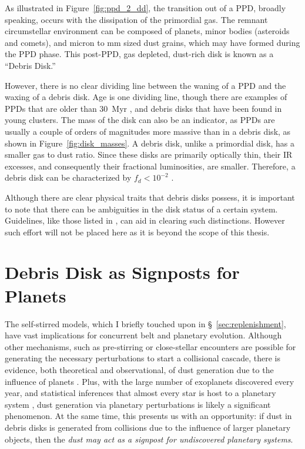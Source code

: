     As illustrated in Figure~\ref{fig:ppd_2_dd}, the transition out of a PPD, broadly speaking, occurs with the dissipation of the primordial gas. The remnant circumstellar environment can be composed of planets, minor bodies (asteroids and comets), and micron to mm sized dust grains, which may have formed during the PPD phase. This post-PPD, gas depleted, dust-rich disk is known as a ``Debris Disk.'' %
    
    However, there is no clear dividing line between the waning of a PPD and the waxing of a debris disk. Age is one dividing line, though there are examples of PPDs that are older than 30~Myr \citep{DeMarchi2013,Scicluna2014}, and debris disks that have been found in young clusters. The mass of the disk can also be an indicator, as PPDs are usually a couple of orders of magnitudes more massive than in a debris disk, as shown in Figure~\ref{fig:disk_masses}. A debris disk, unlike a primordial disk, has a smaller gas to dust ratio. Since these disks are primarily optically thin, their IR excesses, and consequently their fractional luminosities, are smaller. Therefore, a debris disk can be characterized by $f_d<10^{-2}$ \citep{Zuckerman2001, Wyatt2008}. 
    
    Although there are clear physical traits that debris disks possess, it is important to note that there can be ambiguities in the disk status of a certain system. Guidelines, like those listed in \citet{Wyatt2015}, can aid in clearing such distinctions. However such effort will not be placed here as it is beyond the scope of this thesis.
    
    
\section{Debris Disk as Signposts for Planets} \label{sec:disks_signposts_planets}
    
    The self-stirred models, which I briefly touched upon in \S~\ref{sec:replenishment}, have vast implications for concurrent belt and planetary evolution. Although other mechanisms, such as pre-stirring or close-stellar encounters are possible for generating the necessary perturbations to start a collisional cascade, there is evidence, both theoretical and observational, of dust generation due to the influence of planets \citep[e.g., the HD~141569 system,][]{Wyatt2005}. Plus, with the large number of exoplanets discovered every year, and statistical inferences that almost every star is host to a planetary system \citep{Cassan2012}, dust generation via planetary perturbations is likely a significant phenomenon. At the same time, this presents us with an opportunity: if dust in debris disks is generated from collisions due to the influence of larger planetary objects, then the \textit{dust may act as a signpost for undiscovered planetary systems}.
    
